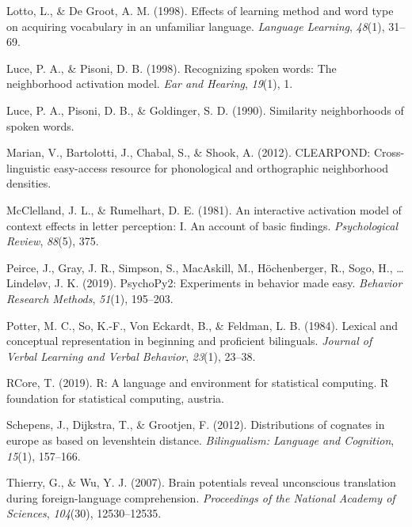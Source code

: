 \documentclass[
  english,
  man,floatsintext]{apa6}
\newlength{\cslhangindent}
\newenvironment{CSLReferences}[2] %
 {%
  \setlength{\parindent}{0pt}
  \ifodd #1 \everypar{\setlength{\hangindent}{\cslhangindent}}\ignorespaces\fi
  \ifnum #2 > 0
  \setlength{\parskip}{#2\baselineskip}
  \fi
 }%
 {}
\begin{document}
\begin{CSLReferences}{1}{0}
\leavevmode{}%
Lotto, L., \& De Groot, A. M. (1998). Effects of learning method and word type on acquiring vocabulary in an unfamiliar language. \emph{Language Learning}, \emph{48}(1), 31--69.

\leavevmode{}%
Luce, P. A., \& Pisoni, D. B. (1998). Recognizing spoken words: The neighborhood activation model. \emph{Ear and Hearing}, \emph{19}(1), 1.

\leavevmode{}%
Luce, P. A., Pisoni, D. B., \& Goldinger, S. D. (1990). Similarity neighborhoods of spoken words.

\leavevmode{}%
Marian, V., Bartolotti, J., Chabal, S., \& Shook, A. (2012). CLEARPOND: Cross-linguistic easy-access resource for phonological and orthographic neighborhood densities.

\leavevmode{}%
McClelland, J. L., \& Rumelhart, D. E. (1981). An interactive activation model of context effects in letter perception: I. An account of basic findings. \emph{Psychological Review}, \emph{88}(5), 375.

\leavevmode{}%
Peirce, J., Gray, J. R., Simpson, S., MacAskill, M., Höchenberger, R., Sogo, H., \ldots{} Lindeløv, J. K. (2019). PsychoPy2: Experiments in behavior made easy. \emph{Behavior Research Methods}, \emph{51}(1), 195--203.

\leavevmode{}%
Potter, M. C., So, K.-F., Von Eckardt, B., \& Feldman, L. B. (1984). Lexical and conceptual representation in beginning and proficient bilinguals. \emph{Journal of Verbal Learning and Verbal Behavior}, \emph{23}(1), 23--38.

\leavevmode{}%
RCore, T. (2019). R: A language and environment for statistical computing. R foundation for statistical computing, austria.

\leavevmode{}%
Schepens, J., Dijkstra, T., \& Grootjen, F. (2012). Distributions of cognates in europe as based on levenshtein distance. \emph{Bilingualism: Language and Cognition}, \emph{15}(1), 157--166.

\leavevmode{}%
Thierry, G., \& Wu, Y. J. (2007). Brain potentials reveal unconscious translation during foreign-language comprehension. \emph{Proceedings of the National Academy of Sciences}, \emph{104}(30), 12530--12535.


\end{CSLReferences}
\end{document}
